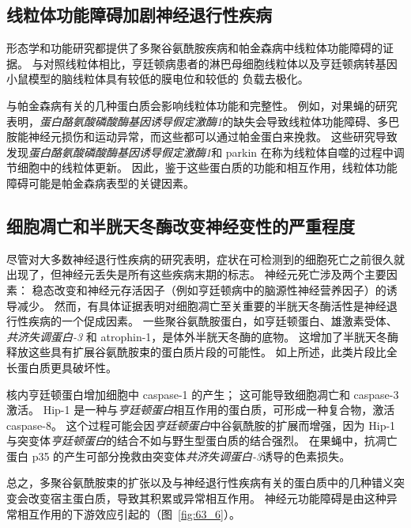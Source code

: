 \subsection{线粒体功能障碍加剧神经退行性疾病}

形态学和功能研究都提供了多聚谷氨酰胺疾病和帕金森病中线粒体功能障碍的证据。
与对照线粒体相比，亨廷顿病患者的淋巴母细胞线粒体以及亨廷顿病转基因小鼠模型的脑线粒体具有较低的膜电位和较低的  负载去极化。


与帕金森病有关的几种蛋白质会影响线粒体功能和完整性。
例如，对果蝇的研究表明，\textit{蛋白酪氨酸磷酸酶基因诱导假定激酶1}的缺失会导致线粒体功能障碍、多巴胺能神经元损伤和运动异常，而这些都可以通过帕金蛋白来挽救。
这些研究导致发现\textit{蛋白酪氨酸磷酸酶基因诱导假定激酶1}和 parkin 在称为线粒体自噬的过程中调节细胞中的线粒体更新。
因此，鉴于这些蛋白质的功能和相互作用，线粒体功能障碍可能是帕金森病表型的关键因素。



\subsection{细胞凋亡和半胱天冬酶改变神经变性的严重程度}

尽管对大多数神经退行性疾病的研究表明，症状在可检测到的细胞死亡之前很久就出现了，但神经元丢失是所有这些疾病末期的标志。
神经元死亡涉及两个主要因素： 稳态改变和神经元存活因子（例如亨廷顿病中的脑源性神经营养因子）的诱导减少。
然而，有具体证据表明对细胞凋亡至关重要的半胱天冬酶活性是神经退行性疾病的一个促成因素。
一些聚谷氨酰胺蛋白，如亨廷顿蛋白、雄激素受体、\textit{共济失调蛋白-3} 和 atrophin-1，是体外半胱天冬酶的底物。
这增加了半胱天冬酶释放这些具有扩展谷氨酰胺束的蛋白质片段的可能性。
如上所述，此类片段比全长蛋白质更具破坏性。


核内亨廷顿蛋白增加细胞中 caspase-1 的产生；
这可能导致细胞凋亡和 caspase-3 激活。
Hip-1 是一种与\textit{亨廷顿蛋白}相互作用的蛋白质，可形成一种复合物，激活 caspase-8。
这个过程可能会因\textit{亨廷顿蛋白}中谷氨酰胺的扩展而增强，因为 Hip-1 与突变体\textit{亨廷顿蛋白}的结合不如与野生型蛋白质的结合强烈。
在果蝇中，抗凋亡蛋白 p35 的产生可部分挽救由突变体\textit{共济失调蛋白-3}诱导的色素损失。


总之，多聚谷氨酰胺束的扩张以及与神经退行性疾病有关的蛋白质中的几种错义突变会改变宿主蛋白质，导致其积累或异常相互作用。
神经元功能障碍是由这种异常相互作用的下游效应引起的（图~\ref{fig:63_6}）。


